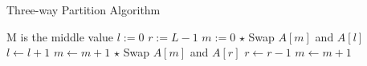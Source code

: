 \begin{algorithm}[H]
\caption{Three-way Partition Algorithm}
\begin{algorithmic}[1]
 \Comment M is the middle value
\State $l:=0$
\State $r:=L-1$
\State $m:=0$
\State $\star$ Swap $A[m]$ and $A[l]$
\State $l\gets l+1$
\State $m\gets m+1$
\State $\star$ Swap $A[m]$ and $A[r]$
\State $r\gets r-1$
\Else
\State $m\gets m+1$
\EndIf
\EndWhile
\EndProcedure
\end{algorithmic}
\end{algorithm}
